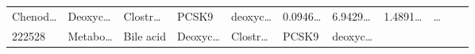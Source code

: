 \documentclass[
]{article}
\begin{document}
\begin{longtable}[]{@{}lllllllllll@{}}
\begin{minipage}[t]{0.07\columnwidth}
Chenod\ldots{}\strut
\end{minipage} & \begin{minipage}[t]{0.09\columnwidth}\raggedright
Deoxyc\ldots{}\strut
\end{minipage} & \begin{minipage}[t]{0.07\columnwidth}\raggedright
Clostr\ldots{}\strut
\end{minipage} & \begin{minipage}[t]{0.07\columnwidth}\raggedright
PCSK9\strut
\end{minipage} & \begin{minipage}[t]{0.09\columnwidth}\raggedright
deoxyc\ldots{}\strut
\end{minipage} & \begin{minipage}[t]{0.07\columnwidth}\raggedright
0.0946\ldots{}\strut
\end{minipage} & \begin{minipage}[t]{0.07\columnwidth}\raggedright
6.9429\ldots{}\strut
\end{minipage} & \begin{minipage}[t]{0.07\columnwidth}\raggedright
1.4891\ldots{}\strut
\end{minipage} & \begin{minipage}[t]{0.03\columnwidth}\raggedright
\ldots{}\strut
\end{minipage}\tabularnewline
\begin{minipage}[t]{0.05\columnwidth}\raggedright
222528\strut
\end{minipage} & \begin{minipage}[t]{0.07\columnwidth}\raggedright
Metabo\ldots{}\strut
\end{minipage} & \begin{minipage}[t]{0.07\columnwidth}\raggedright
Bile acid\strut
\end{minipage} & \begin{minipage}[t]{0.09\columnwidth}\raggedright
Deoxyc\ldots{}\strut
\end{minipage} & \begin{minipage}[t]{0.07\columnwidth}\raggedright
Clostr\ldots{}\strut
\end{minipage} & \begin{minipage}[t]{0.07\columnwidth}\raggedright
PCSK9\strut
\end{minipage} & \begin{minipage}[t]{0.09\columnwidth}\raggedright
deoxyc\ldots{}\strut
\end{minipage} & \begin{minipage}[t]{0.07\columnwidth}\raggedright

\end{minipage}
\end{longtable}
\end{document}
